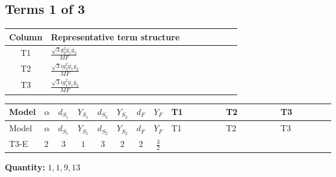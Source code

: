 \documentclass[8pt]{article}
\begin{document}
\begin{landscape}
\subsection*{Terms 1 of 3}
\begin{center}
\begin{tabular}{@{}c >{\raggedright\arraybackslash}p{0.82\linewidth}@{}}
\toprule
Column & Representative term structure \\
\midrule
T1 & \(\displaystyle \frac{\sqrt{3} g_{2}^{2} \overline{y_{1}} \overline{y_{2}}}{MF}\) \\
\midrule
T2 & \(\displaystyle \frac{\sqrt{3} i g_{2}^{2} \overline{y_{1}} \overline{y_{2}}}{MF}\) \\
\midrule
T3 & \(\displaystyle \frac{\sqrt{3} i g_{1}^{2} \overline{y_{1}} \overline{y_{2}}}{MF}\) \\
\midrule
\bottomrule
\end{tabular}
\end{center}
\smallskip
\tiny
\begin{longtable}{@{}llcccccc >{\raggedright\arraybackslash}p{0.21\linewidth} >{\raggedright\arraybackslash}p{0.21\linewidth} >{\raggedright\arraybackslash}p{0.21\linewidth}@{}}
\toprule
Model & $\alpha$ & $d_{S_1}$ & $Y_{S_1}$ & $d_{S_2}$ & $Y_{S_2}$ & $d_F$ & $Y_F$ & T1 & T2 & T3 \\
\midrule
\endfirsthead
\toprule
Model & $\alpha$ & $d_{S_1}$ & $Y_{S_1}$ & $d_{S_2}$ & $Y_{S_2}$ & $d_F$ & $Y_F$ & T1 & T2 & T3 \\
\midrule
\endhead
T3-E & $2$ & $3$ & $1$ & $3$ & $2$ & $2$ & $\frac{3}{2}$ & \scriptsize\adjustbox{max width=\linewidth}{$\begin{gathered} - \frac{\sqrt{3} g_{2}^{2} \overline{y_{1}} \overline{y_{2}}}{6 MF}\end{gathered}$} & \scriptsize\adjustbox{max width=\linewidth}{$\begin{gathered} - \frac{49 \sqrt{3} i g_{2}^{2} \overline{y_{1}} \overline{y_{2}}}{24 MF}\end{gathered}$} & \scriptsize\adjustbox{max width=\linewidth}{$\begin{gathered} - \frac{9 \sqrt{3} i g_{1}^{2} \overline{y_{1}} \overline{y_{2}}}{8 MF}\end{gathered}$} \\
\midrule
\bottomrule
\end{longtable}
\clearpage
\noindent\textbf{Quantity: }$\mathrm{1,1,9,13}$\par\smallskip

\end{landscape}
\end{document}
